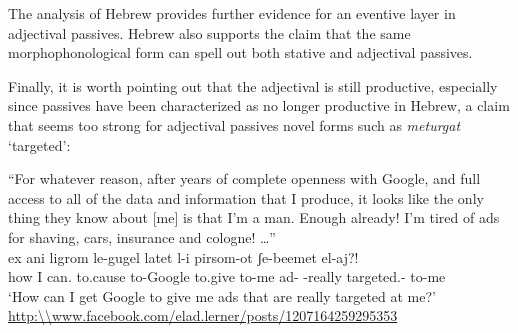 \begin{exe}
\begin{xlist}
\begin{exe}
\begin{xlist}
\begin{exe}
\begin{exe}
\begin{xlist}
\begin{exe}
\begin{exe}
\begin{xlist}
\begin{exe}
\begin{xlist}
\begin{exe}
\begin{xlist}
\begin{exe}
\begin{xlist}
\begin{exe}
\begin{xlist}
\begin{xlist}
\begin{exe}
\begin{xlist}
\begin{exe}
\begin{xlist}
\begin{exe}
\begin{exe}
\begin{exe}
\begin{xlist}
\begin{exe}
\begin{exe}
\begin{xlist}
\begin{exe}
\begin{xlist}
\begin{exe}
\begin{xlist}
\begin{exe}
\begin{xlist}
\begin{xlist}
\begin{exe}
\begin{xlist}
\begin{exe}
\begin{xlist}
\begin{exe}
\begin{xlist}
\begin{exe}
\begin{xlist}
\begin{exe}
\begin{exe}
\begin{exe}
\begin{exe}
\begin{exe}
\begin{xlist}
\begin{xlist}
\begin{exe}
\begin{xlist}
\begin{exe}
\begin{xlist}
\begin{exe}
\begin{exe}
\begin{exe}
\begin{xlist}
\begin{exe}
\begin{xlist}
\begin{exe}
\begin{xlist}
The analysis of Hebrew provides further evidence for an eventive layer in adjectival passives. Hebrew also supports the claim that the same morphophonological form can spell out both stative and adjectival passives.

Finally, it is worth pointing out that the adjectival  is still productive, especially since passives have been characterized as no longer productive in Hebrew, a claim that seems too strong for adjectival passives novel forms such as \emph{meturgat} `targeted':
 \begin{exe}
\ex  ``For whatever reason, after years of complete openness with Google, and full access to all of the data and information that I produce, it looks like the only thing they know about [me] is that I'm a man. Enough already! I'm tired of ads for shaving, cars, insurance and cologne! \dots '' \\
	 \gll ex ani  ligrom le-gugel latet l-i pirsom-ot ʃe-beemet  el-aj?!\\
 		  how I can. to.cause to-Google to.give to-me ad- -really targeted.- to-me\\
 		\glt `How can I get Google to give me ads that are really targeted at me?' \hfill \url{http:\\www.facebook.com/elad.lerner/posts/1207164259295353} 
 \z 



\end{exe}
\end{xlist}
\end{exe}
\end{xlist}
\end{exe}
\end{xlist}
\end{exe}
\end{exe}
\end{exe}
\end{xlist}
\end{exe}
\end{xlist}
\end{exe}
\end{xlist}
\end{xlist}
\end{exe}
\end{exe}
\end{exe}
\end{exe}
\end{exe}
\end{xlist}
\end{exe}
\end{xlist}
\end{exe}
\end{xlist}
\end{exe}
\end{xlist}
\end{exe}
\end{xlist}
\end{xlist}
\end{exe}
\end{xlist}
\end{exe}
\end{xlist}
\end{exe}
\end{xlist}
\end{exe}
\end{exe}
\end{xlist}
\end{exe}
\end{exe}
\end{exe}
\end{xlist}
\end{exe}
\end{xlist}
\end{exe}
\end{xlist}
\end{xlist}
\end{exe}
\end{xlist}
\end{exe}
\end{xlist}
\end{exe}
\end{xlist}
\end{exe}
\end{xlist}
\end{exe}
\end{exe}
\end{xlist}
\end{exe}
\end{exe}
\end{xlist}
\end{exe}
\end{xlist}
\end{exe}
